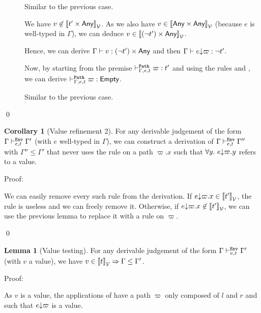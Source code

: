 \documentclass[a4paper]{article}
\theoremstyle{definition}
\newtheorem{lemma}{Lemma}
\newtheorem{corollary}{Corollary}
\begin{document}
\begin{description}
          \item[] Similar to the previous case.

          \item[] We have $v \not\in {\llbracket t'\times \textsf{Any}\rrbracket}_{\mathcal{V}}$.
          As we also have $v \in {\llbracket \textsf{Any}\times \textsf{Any}\rrbracket}_{\mathcal{V}}$ (because $e$ is well-typed in $\Gamma$),
          we can deduce $v \in {\llbracket (\neg t')\times \textsf{Any}\rrbracket}_{\mathcal{V}}$.

          Hence, we can derive $\Gamma \vdash v:(\neg t')\times \textsf{Any}$ and then $\Gamma \vdash e{\downarrow}\varpi:\neg t'$.
          
          Now, by starting from the premise $\vdash^{\texttt{Path}}_{\Gamma,e,t} \varpi:t'$ and using the rules  and ,
          we can derive $\vdash^{\texttt{Path}}_{\Gamma,e,t} \varpi:\textsf{Empty}$.
          \item[] Similar to the previous case.
        \end{description}
        \qed

        \begin{corollary}[Value refinement 2]
          For any derivable judgement of the form $\Gamma \vdash^{\texttt{Env}}_{e,t} \Gamma'$ (with $e$ well-typed in $\Gamma$), we can construct a derivation of $\Gamma \vdash^{\texttt{Env}}_{e,t} \Gamma''$ with $\Gamma''\leq\Gamma'$
          that never uses the rule  on a path $\varpi.x$ such that $\forall y.\ e{\downarrow}\varpi.y$ refers to a value.
        \end{corollary}

        Proof:

        We can easily remove every such rule from the derivation. If $e{\downarrow}\varpi.x \in {\llbracket t' \rrbracket}_{\mathcal{V}}$, the  rule is useless
        and we can freely remove it. Otherwise, if $e{\downarrow}\varpi.x \not\in {\llbracket t' \rrbracket}_{\mathcal{V}}$, we can use the previous lemma to
        replace it with a  rule on $\varpi$.

        \qed

        \begin{lemma}[Value testing]
          For any derivable judgement of the form $\Gamma \vdash^{\texttt{Env}}_{v,t} \Gamma'$ (with $v$ a value),
          we have $v \in {\llbracket t \rrbracket}_{\mathcal{V}} \Rightarrow \Gamma\leq\Gamma'$.
        \end{lemma}

        Proof:

        As $v$ is a value, the applications of  have a path $\varpi$ only composed of $l$ and $r$
        and such that $e{\downarrow}\varpi$ is a value.
\end{document}
